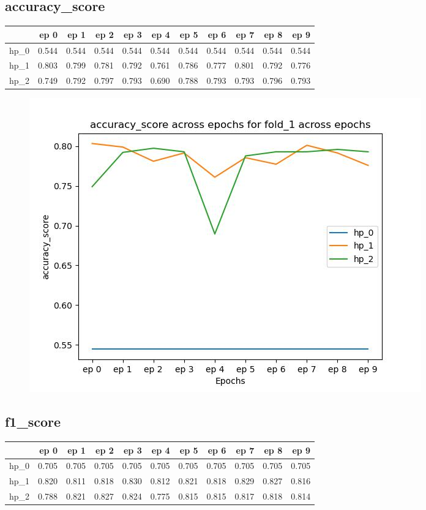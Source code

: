 \documentclass{article}
\begin{document}
\subsection{accuracy\_score}
\begin{tabular}{lrrrrrrrrrr}
\toprule
{} &   ep 0 &   ep 1 &   ep 2 &   ep 3 &   ep 4 &   ep 5 &   ep 6 &   ep 7 &   ep 8 &   ep 9 \\
\midrule
hp\_0 &  0.544 &  0.544 &  0.544 &  0.544 &  0.544 &  0.544 &  0.544 &  0.544 &  0.544 &  0.544 \\
hp\_1 &  0.803 &  0.799 &  0.781 &  0.792 &  0.761 &  0.786 &  0.777 &  0.801 &  0.792 &  0.776 \\
hp\_2 &  0.749 &  0.792 &  0.797 &  0.793 &  0.690 &  0.788 &  0.793 &  0.793 &  0.796 &  0.793 \\
\bottomrule
\end{tabular}

\begin{figure}[H]
\includegraphics[scale = 0.75]{fold_1/accuracy_score}
\end{figure}
\subsection{f1\_score}
\begin{tabular}{lrrrrrrrrrr}
\toprule
{} &   ep 0 &   ep 1 &   ep 2 &   ep 3 &   ep 4 &   ep 5 &   ep 6 &   ep 7 &   ep 8 &   ep 9 \\
\midrule
hp\_0 &  0.705 &  0.705 &  0.705 &  0.705 &  0.705 &  0.705 &  0.705 &  0.705 &  0.705 &  0.705 \\
hp\_1 &  0.820 &  0.811 &  0.818 &  0.830 &  0.812 &  0.821 &  0.818 &  0.829 &  0.827 &  0.816 \\
hp\_2 &  0.788 &  0.821 &  0.827 &  0.824 &  0.775 &  0.815 &  0.815 &  0.817 &  0.818 &  0.814 \\
\bottomrule
\end{tabular}
\end{document}
